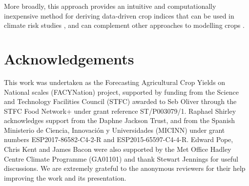 \documentclass[12pt]{article}
\begin{document}
More broadly, this approach provides an intuitive and computationally inexpensive method for deriving data-driven crop indices that can be used in climate risk studies \cite[e.g.][]{kent:2017}, and can complement other approaches to modelling crops \citep[e.g.][]{schlenker:2009, lobell:2010, carter:2016, zhou:2018}. 

\section*{Acknowledgements}

This work was undertaken as the Forecasting Agricultural Crop Yields on National scales (FACYNation) project, supported by funding from the Science and Technology Facilities Council (STFC) awarded to Seb Oliver through the STFC Food Network+ under grant reference ST/P003079/1. Raphael Shirley acknowledges support from the Daphne Jackson Trust, and from the Spanish Ministerio de Ciencia, Innovaci\'{o}n y Universidades (MICINN) under grant numbers ESP2017-86582-C4-2-R and ESP2015-65597-C4-4-R. Edward Pope, Chris Kent and James Bacon were also supported by the Met Office Hadley Centre Climate Programme (GA01101) and thank Stewart Jennings for useful discussions. We are extremely grateful to the anonymous reviewers for their help improving the work and its presentation. 




%
% 

% 
%




\end{document}
